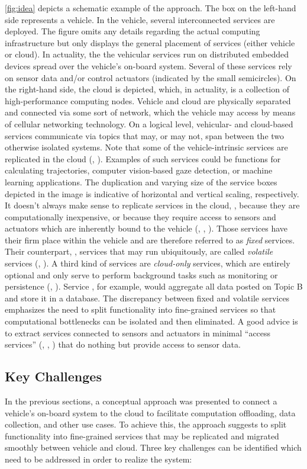 \autoref{fig:idea} depicts a schematic example of the approach. The box on the left-hand side represents a vehicle. In the vehicle, several interconnected services are deployed. The figure omits any details regarding the actual computing infrastructure but only displays the general placement of services (either vehicle or cloud). In actuality, the the vehicular services run on distributed embedded devices spread over the vehicle's on-board system. Several of these services rely on sensor data and/or control actuators (indicated by the small semicircles). On the right-hand side, the cloud is depicted, which, in actuality, is a collection of high-performance computing nodes. Vehicle and cloud are physically separated and connected via some sort of network, which the vehicle may access by means of cellular networking technology. On a logical level, vehicular- and cloud-based services communicate via topics that may, or may not, span between the two otherwise isolated systems. Note that some of the vehicle-intrinsic services are replicated in the cloud (, ). Examples of such services could be functions for calculating trajectories, computer vision-based gaze detection, or machine learning applications. The duplication and varying size of the service boxes depicted in the image is indicative of horizontal and vertical scaling, respectively. It doesn't always make sense to replicate services in the cloud, \eg , because they are computationally inexpensive, or because they require access to sensors and actuators which are inherently bound to the vehicle (, , ). Those services have their firm place within the vehicle and are therefore referred to as \emph{fixed} services. Their counterpart, \ie , services that may run ubiquitously, are called \emph{volatile} services (, ). A third kind of services are \emph{cloud-only} services, which are entirely optional and only serve to perform background tasks such as monitoring or persistence (, ). Service , for example, would aggregate all data posted on Topic B and store it in a database. The discrepancy between fixed and volatile services emphasizes the need to split functionality into fine-grained services so that computational bottlenecks can be isolated and then eliminated. A good advice is to extract services connected to sensors and actuators in minimal ``access services'' (, , ) that do nothing but provide access to sensor data.
%
%
%
%
%
%
%
%
%
%
\subsection{Key Challenges} 
\label{sec:challenges}
In the previous sections, a conceptual approach was presented to connect a vehicle's on-board system to the cloud to facilitate computation offloading, data collection, and other use cases. To achieve this, the approach suggests to split functionality into fine-grained services that may be replicated and migrated smoothly between vehicle and cloud. Three key challenges can be identified which need to be addressed in order to realize the system:

